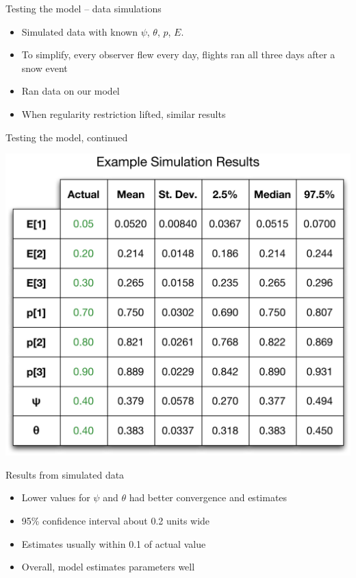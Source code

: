 \documentclass{beamer}
\begin{document}
\begin{frame}{Testing the model -- data simulations}
	\begin{itemize}
		\item Simulated data with known $\psi$, $\theta$, $p$, $E$.
		\item To simplify, every observer flew every day, flights ran all
		three days after a snow event
		\item Ran data on our model
		\item When regularity restriction lifted, similar results
	\end{itemize}
\end{frame}

\begin{frame}{Testing the model, continued}
	\begin{center}
	\includegraphics[scale=0.5]{Figures/Diagrams/SimulatedData.pdf}
	\end{center}
\end{frame}

\begin{frame}{Results from simulated data}
	\begin{itemize}
		\item Lower values for $\psi$ and $\theta$ had better convergence and
		estimates
		\item 95\% confidence interval about 0.2 units wide
		\item Estimates usually within 0.1 of actual value
		\item Overall, model estimates parameters well
	\end{itemize}
\end{frame}
\end{document}
